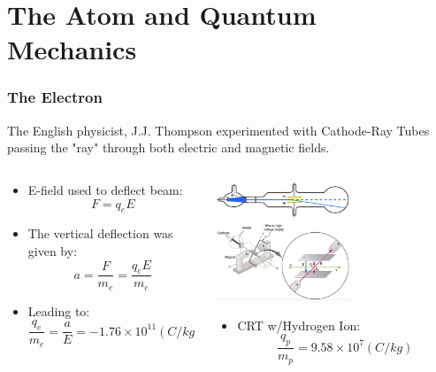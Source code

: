 \documentclass{beamer}
\begin{document}
\section{The Atom and Quantum Mechanics}

\begin{frame}\frametitle{The Electron}
The English physicist, J.J. Thompson experimented with Cathode-Ray Tubes passing the "ray" through both electric and magnetic fields.
\begin{columns}
\begin{column}{7cm}


\begin{itemize}
\item E-field used to deflect beam:
\[ F = q_e E \]
\item The vertical deflection was given by:
\[ a = \frac{F}{m_e} = \frac{q_e E}{m_e} \]

\item Leading to:
\[ \frac{q_e}{m_e} = \frac{a}{E} = -1.76 \times 10^{11} (C/kg) \]
\end{itemize}
\end{column}
\begin{column}{4.5cm}
\begin{center}
\includegraphics[width=4cm]{fig/crt1.jpg}
\includegraphics[width=4cm]{fig/crt2.jpg}
\end{center}
\begin{itemize}
\item CRT w/Hydrogen Ion:
\[ \frac{q_p}{m_p} = 9.58 \times 10^7 (C/kg) \]
\end{itemize}

\end{column}
\end{columns}
\end{frame}
\end{document}
